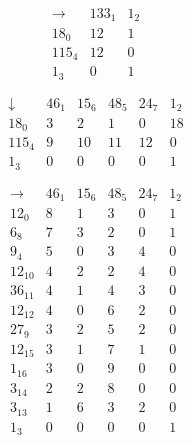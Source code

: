 {\renewcommand{\arraycolsep}{1pt}
\begin{align*}
\begin{array}{r|*{2}{r}}
\rightarrow  &    133_{  1} &      1_{  2}\\
\hline
    18_{  0} &           12 &            1\\
   115_{  4} &           12 &            0\\
     1_{  3} &            0 &            1\\
\end{array}
\end{align*}
}
{\renewcommand{\arraycolsep}{1pt}
\begin{align*}
\begin{array}{r|*{5}{r}}
\downarrow  &     46_{  1} &     15_{  6} &     48_{  5} &     24_{  7} &      1_{  2}\\
\hline
    18_{  0} &            3 &            2 &            1 &            0 &           18\\
   115_{  4} &            9 &           10 &           11 &           12 &            0\\
     1_{  3} &            0 &            0 &            0 &            0 &            1\\
\end{array}
\end{align*}
}
{\renewcommand{\arraycolsep}{1pt}
\begin{align*}
\begin{array}{r|*{5}{r}}
\rightarrow  &     46_{  1} &     15_{  6} &     48_{  5} &     24_{  7} &      1_{  2}\\
\hline
    12_{  0} &            8 &            1 &            3 &            0 &            1\\
     6_{  8} &            7 &            3 &            2 &            0 &            1\\
     9_{  4} &            5 &            0 &            3 &            4 &            0\\
    12_{ 10} &            4 &            2 &            2 &            4 &            0\\
    36_{ 11} &            4 &            1 &            4 &            3 &            0\\
    12_{ 12} &            4 &            0 &            6 &            2 &            0\\
    27_{  9} &            3 &            2 &            5 &            2 &            0\\
    12_{ 15} &            3 &            1 &            7 &            1 &            0\\
     1_{ 16} &            3 &            0 &            9 &            0 &            0\\
     3_{ 14} &            2 &            2 &            8 &            0 &            0\\
     3_{ 13} &            1 &            6 &            3 &            2 &            0\\
     1_{  3} &            0 &            0 &            0 &            0 &            1\\
\end{array}
\end{align*}
}

